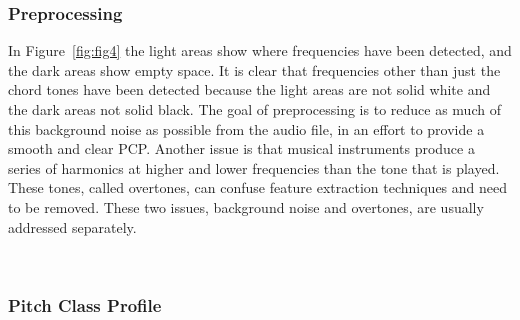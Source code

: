 \documentclass{sig-alternate}
\begin{document}
\subsubsection{Preprocessing}

In Figure~\ref{fig:fig4} the light areas show where frequencies have been detected, and the dark areas show empty space. It is clear that frequencies other than just the chord tones have been detected because the light areas are not solid white and the dark areas not solid black. The goal of preprocessing is to reduce as much of this background noise as possible from the audio file, in an effort to provide a smooth and clear PCP. Another issue is that musical instruments produce a series of harmonics at higher and lower frequencies than the tone that is played. These tones, called overtones, can confuse feature extraction techniques and need to be removed. These two issues, background noise and overtones, are usually addressed separately.



~\\

\subsubsection{Pitch Class Profile} 
\end{document}
